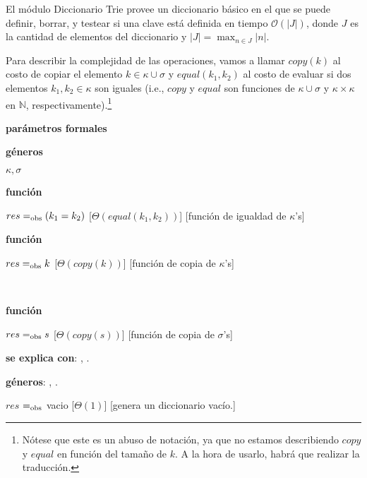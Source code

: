 \documentclass{book}
\newcommand{\bigO}{\mathcal{O}}
\begin{document}
\begin{Algoritmos}

El módulo Diccionario Trie provee un diccionario básico en el que se puede definir, borrar, y testear si una clave está definida en tiempo $\bigO(|J|)$, donde $J$ es la cantidad de elementos del diccionario y $|J|=\max_{n\in J}{|n|}$. 

Para describir la complejidad de las operaciones, vamos a llamar $copy(k)$ al costo de copiar el elemento $k \in \kappa \cup \sigma$ y $equal(k_1, k_2)$ al costo de evaluar si dos elementos $k_1, k_2 \in \kappa$ son iguales (i.e., $copy$ y $equal$ son funciones de $\kappa \cup \sigma$ y $\kappa \times \kappa$ en $\mathbb{N}$, respectivamente).\footnote{Nótese que este es un abuso de notación, ya que no estamos describiendo $copy$ y $equal$ en función del tamaño de $k$.  A la hora de usarlo, habrá que realizar la traducción.}

\begin{Interfaz}

  \textbf{parámetros formales}\parindent\\
  \parbox{1.7cm}{\textbf{géneros}}$\kappa,\sigma$\\
  \parbox[t]{1.7cm}{\textbf{función}}\parbox[t]{.5\textwidth-\parindent-1.7cm}{%
    {$res =_{\mathrm{obs}} (k_1 = k_2)$}
    [$\Theta(equal(k_1, k_2))$]
    [función de igualdad de $\kappa$'s]
  }%
  \parbox[t]{1.7cm}{\textbf{función}}\parbox[t]{.5\textwidth-\parindent-1.7cm}{%
    {$res =_{\mathrm{obs}} k$}
    [$\Theta(copy(k))$]
    [función de copia de $\kappa$'s]
  }\\[2ex]
  \parbox[t]{1.7cm}{\textbf{función}}\parbox[t]{.5\textwidth-\parindent-1.7cm}{%
    {$res =_{\mathrm{obs}} s$}
    [$\Theta(copy(s))$]
    [función de copia de $\sigma$'s]
  }

  \textbf{se explica con}: , .

  \textbf{géneros}: , .


  {$res$ $=_{\mathrm{obs}}$ vacio}%
  [$\Theta(1)$]
  [genera un diccionario vacío.]


\end{Interfaz}
\end{Algoritmos}
\end{document}
